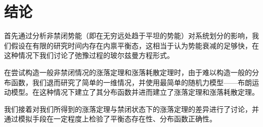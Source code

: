 \section{结论}
首先通过分析非禁闭势能（即在无穷远处趋于平坦的势能）对系统划分的影响，我们假设在有限的研究时间内存在内禀平衡态，这相当于认为势能衰减的足够快，在这种情况下我们讨论了弛豫过程的玻尔兹曼方程形式。

在尝试构造一般非禁闭情况的涨落定理和涨落耗散定理时，由于难以构造一般的分布函数，我们退而研究了简单的一维情况，并使用最简单的随机力模型——布朗运动模型。在这种情况下建立了其分布函数并进而建立了涨落定理和涨落耗散定理。

我们接着对我们所得到的涨落定理与禁闭状态下的涨落定理的差异进行了讨论，并通过模拟手段在一定程度上检验了平衡态存在性、分布函数正确性。